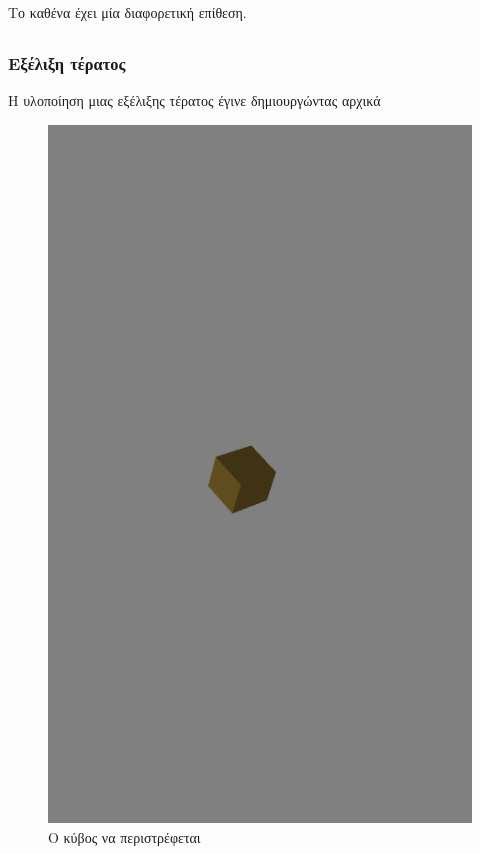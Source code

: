 \documentclass[11pt]{scrartcl} %
\begin{document}

Το καθένα έχει μία διαφορετική επίθεση.

\subsection{}

\subsubsection{Εξέλιξη τέρατος}

Η υλοποίηση μιας εξέλιξης τέρατος έγινε δημιουργώντας αρχικά 

\begin{figure}[H]
	\begin{center}
		\includegraphics[height=.5\textheight]{./assets/cube.png}
	\end{center}
	\caption{Ο κύβος να περιστρέφεται}
\end{figure}
\end{document}
